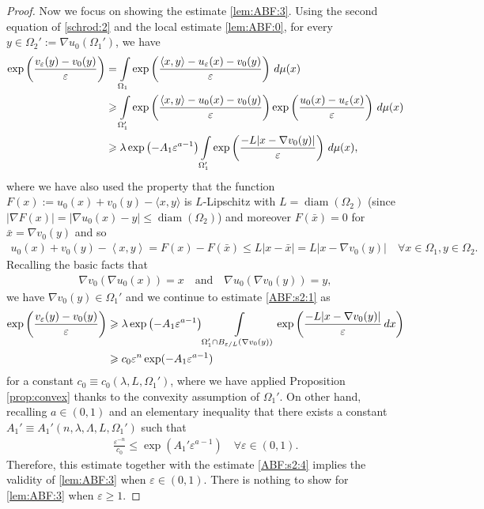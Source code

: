 \documentclass[reqno,12pt]{article}
\DeclareMathOperator{\diam}{diam}
\newcommand{\inner}[2]{\left\langle #1, #2 \right\rangle}
\newcommand{\I}{\int\limits}
\begin{document}
\begin{proof}
Now we focus on showing the estimate \eqref{lem:ABF:3}. Using the second equation of \eqref{schrod:2} and the local estimate \eqref{lem:ABF:0}, for every $y\in \Omega_{2}':= \nabla u_{0}(\Omega_{1}')$, we have 
\begin{align}
    \label{ABF:s2:1}
    \exp\left( \frac{v_{\varepsilon}(y)-v_{0}(y)}{\varepsilon}\right) 
    &=
    \I_{\Omega_{1}} \exp\left( \frac{\inner{x}{y}-u_{\varepsilon}(x)-v_{0}(y)}{\varepsilon} \right)\,d\mu(x)
    \notag\\&
    \geqslant
    \I_{\Omega_{1}'} \exp\left( \frac{\inner{x}{y}-u_{0}(x)-v_{0}(y)}{\varepsilon} \right) \exp\left( \frac{u_{0}(x)-u_{\varepsilon}(x)}{\varepsilon} \right)\,d\mu(x)
    \notag\\&
    \geqslant
    \lambda \exp\left( -A_{1} \varepsilon^{a-1} \right)\I_{\Omega_{1}'} \exp\left( \frac{-L|x-\nabla v_{0}(y)|}{\varepsilon} \right)\,d\mu(x),
\end{align}
where we have also used the property that the function $F(x):= u_0(x)+v_0(y) - \langle x, y \rangle $ is $L$-Lipschitz with $L=\diam(\Omega_2)$ (since $|\nabla F (x)|= |\nabla u_0(x)- y| \leqslant  \diam(\Omega_2)$) and moreover $F(\bar{x})=0$ for $\bar{x}= \nabla v_0(y)$ and so
\begin{align*}
    u_{0}(x) + v_{0}(y)-\inner{x}{y} = F(x)-F(\bar{x}) \leqslant L|x-\bar{x}| = L|x-\nabla v_{0}(y)|\quad \forall x\in \Omega_1, y\in \Omega_2.
\end{align*}
Recalling the basic facts \cite{ambrosio13, Bre91} that 
\begin{align*}
    \nabla v_{0}(\nabla u_{0}(x)) = x
    \quad
    \text{and}
    \quad
    \nabla u_{0}(\nabla v_{0}(y)) = y,
\end{align*}
we have $\nabla v_{0}(y)\in \Omega_{1}'$ and we continue to estimate \eqref{ABF:s2:1} as 
\begin{align}
    \label{ABF:s2:4}
    \exp\left( \frac{v_{\varepsilon}(y)-v_{0}(y)}{\varepsilon} \right)
    &\geqslant
    \lambda\exp\left( -A_{1}\varepsilon^{a-1} \right) \I_{\Omega_{1}'\cap B_{\varepsilon/L}(\nabla v_{0}(y))}\exp\left(\frac{-L|x-\nabla v_{0}(y)|}{\varepsilon}\,dx \right)
    \notag \\& 
    \geqslant
    c_{0}\varepsilon^{n}\exp(-A_{1}\varepsilon^{a-1})
\end{align}
for a constant $c_{0}\equiv c_{0}(\lambda,L,\Omega_{1}')$, where we have applied Proposition \ref{prop:convex} thanks to the convexity assumption of $\Omega_{1}'$. On other hand, recalling $a\in (0,1)$ and an elementary inequality that there exists a constant $A_{1}'\equiv A_{1}'(n,\lambda,\Lambda,L,\Omega_{1}')$ such that
\begin{align*}
    \frac{\varepsilon^{-n}}{c_{0}} \leqslant \exp\left( A_{1}'\varepsilon^{a-1} \right)\quad \forall \varepsilon\in (0,1).
\end{align*}
Therefore, this estimate together with the estimate \eqref{ABF:s2:4} implies the validity of \eqref{lem:ABF:3} when $\varepsilon\in (0,1)$. There is nothing to show for \eqref{lem:ABF:3} when $\varepsilon\geqslant 1$.
\end{proof}
\end{document}
